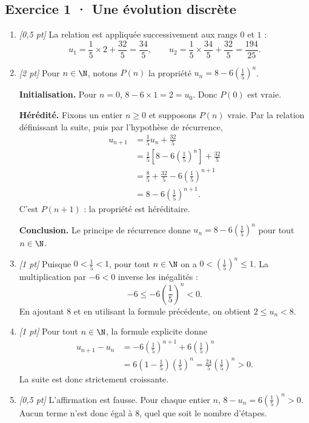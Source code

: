 \subsection*{Exercice 1 · Une évolution discrète}\begin{enumerate}

\item \textit{[0{,}5 pt]} La relation est appliquée successivement aux rangs $0$ et $1$ :\[u_1=\frac{1}{5}\times 2+\frac{32}{5}=\frac{34}{5},\qquad u_2=\frac{1}{5}\times \frac{34}{5}+\frac{32}{5}=\frac{194}{25}.\]

\item \textit{[2 pt]} Pour $n\in\N$, notons $P(n)$ la propriété $u_n=8-6\left(\frac{1}{5}\right)^n$.
\par\smallskip\textbf{Initialisation.} Pour $n=0$, $8-6\times1=2=u_0$. Donc $P(0)$ est vraie.
\par\smallskip\textbf{Hérédité.} Fixons un entier $n\ge0$ et supposons $P(n)$ vraie. Par la relation définissant la suite, puis par l'hypothèse de récurrence,
\[\begin{aligned}u_{n+1}&=\frac{1}{5}u_n+\frac{32}{5}\\
&=\frac{1}{5}\left[8-6\left(\frac{1}{5}\right)^n\right]+\frac{32}{5}\\
&=\frac{8}{5}+\frac{32}{5}-6\left(\frac{1}{5}\right)^{n+1}\\
&=8-6\left(\frac{1}{5}\right)^{n+1}.
\end{aligned}\]
C'est $P(n+1)$ : la propriété est héréditaire.
\par\smallskip\textbf{Conclusion.} Le principe de récurrence donne $u_n=8-6\left(\frac{1}{5}\right)^n$ pour tout $n\in\N$.

\item \textit{[1 pt]} Puisque $0<\frac{1}{5}<1$, pour tout $n\in\N$ on a $0<(\frac{1}{5})^n\le1$. La multiplication par $-6<0$ inverse les inégalités :
\[-6\le-6(\frac{1}{5})^n<0.\]
En ajoutant $8$ et en utilisant la formule précédente, on obtient $2\le u_n<8$.

\item \textit{[1 pt]} Pour tout $n\in\N$, la formule explicite donne
\[\begin{aligned}u_{n+1}-u_n&=-6(\frac{1}{5})^{n+1}+6(\frac{1}{5})^n\\&=6(1-\frac{1}{5})(\frac{1}{5})^n=\frac{24}{5}(\frac{1}{5})^n>0.\end{aligned}\]
La suite est donc strictement croissante.

\item \textit{[0{,}5 pt]} L'affirmation est fausse. Pour chaque entier $n$, $8-u_n=6(\frac{1}{5})^n>0$. Aucun terme n'est donc égal à $8$, quel que soit le nombre d'étapes.

\end{enumerate}

